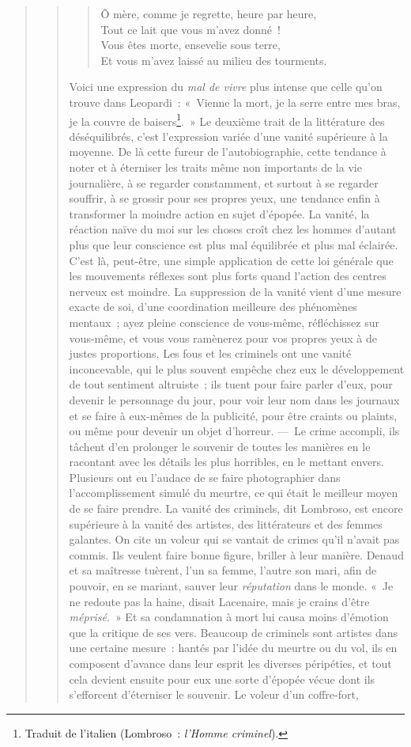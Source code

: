 \documentclass[french,twoside]{book} %
\begin{document}
\begin{verse}
\begin{verse}
\begin{verse}
Ô mère, comme je regrette, heure par heure,\\
Tout ce lait que vous m’avez donné !\\
Vous êtes morte, ensevelie sous terre,\\
Et vous m’avez laissé au milieu des tourments.\\
\end{verse}

\noindent Voici une expression du \emph{mal de vivre} plus intense que celle qu’on trouve dans Leopardi : « Vienne la mort, je la serre entre mes bras, je la couvre de baisers\footnote{ Traduit de l’italien (Lombroso : \emph{l’Homme criminel}).}. » Le deuxième trait de la littérature des déséquilibrés, c’est l’expression variée d’une vanité supérieure à la moyenne. De là cette fureur de l’autobiographie, cette tendance à noter et à éterniser les traits même non importants de la vie journalière, à se regarder constamment, et surtout à se regarder souffrir, à se grossir pour ses propres yeux, une tendance enfin à transformer la moindre action en sujet d’épopée. La vanité, la réaction naïve du moi sur les choses croît chez les hommes d’autant plus que leur conscience est plus mal équilibrée et plus mal éclairée. C’est là, peut-être, une simple application de cette loi générale que les mouvements réflexes sont plus forts quand l’action des centres nerveux est moindre. La suppression de la vanité vient d’une mesure exacte de soi, d’une coordination meilleure des phénomènes mentaux ; ayez pleine conscience de vous-même, réfléchissez sur vous-même, et vous vous ramènerez pour vos propres yeux à de justes proportions. Les fous et les criminels ont une vanité inconcevable, qui le plus souvent empêche chez eux le développement de tout sentiment altruiste ; ils tuent pour faire parler d’eux, pour devenir le personnage du jour, pour voir leur nom dans les journaux et se faire à eux-mêmes de la publicité, pour être craints ou plaints, ou même pour devenir un objet d’horreur. — Le crime accompli, ils tâchent d’en prolonger le souvenir de toutes les manières en le racontant avec les détails les plus horribles, en le mettant envers. Plusieurs ont eu l’audace de se faire photographier dans l’accomplissement simulé du meurtre, ce qui était le meilleur moyen de se faire prendre. La vanité des criminels, dit Lombroso, est encore supérieure à la vanité des artistes, des littérateurs et des femmes galantes. On cite un voleur qui se vantait de crimes qu’il n’avait pas commis. Ils veulent faire bonne figure, briller à leur manière. Denaud et sa maîtresse tuèrent, l’un sa femme, l’autre son mari, afin de pouvoir, en se mariant, sauver leur \emph{réputation} dans le monde. « Je ne redoute pas la haine, disait Lacenaire, mais je crains d’être \emph{méprisé}. » Et sa condamnation à mort lui causa moins d’émotion que la critique de ses vers. Beaucoup de criminels sont artistes dans une certaine mesure : hantés par l’idée du meurtre ou du vol, ils en composent d’avance dans leur esprit les diverses péripéties, et tout cela devient ensuite pour eux une sorte d’épopée vécue dont ils s’efforcent d’éterniser le souvenir. Le voleur d’un coffre-fort, 
\end{verse}
\end{verse}
\end{document}
